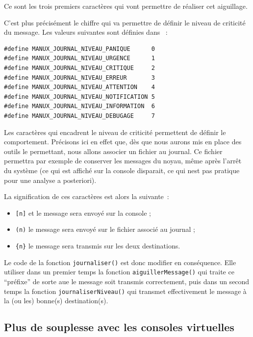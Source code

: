    Ce sont les trois premiers caractères qui vont permettre de
réaliser cet aiguillage.

   C'est plus précisément le chiffre qui va permettre de définir le
niveau de criticité du message. Les valeurs suivantes sont définies
dans ~:

\begin{lstlisting}
#define MANUX_JOURNAL_NIVEAU_PANIQUE      0
#define MANUX_JOURNAL_NIVEAU_URGENCE      1
#define MANUX_JOURNAL_NIVEAU_CRITIQUE     2
#define MANUX_JOURNAL_NIVEAU_ERREUR       3
#define MANUX_JOURNAL_NIVEAU_ATTENTION    4
#define MANUX_JOURNAL_NIVEAU_NOTIFICATION 5
#define MANUX_JOURNAL_NIVEAU_INFORMATION  6
#define MANUX_JOURNAL_NIVEAU_DEBUGAGE     7
\end{lstlisting}  

   Les caractères qui encadrent le niveau de criticité permettent de
définir le comportement. Précisons ici en effet que, dès que nous
aurons mis en place des outils le permettant, nous allons associer un
fichier au journal. Ce fichier permettra par exemple de conserver les
messages du noyau, même après l'arrêt du système (ce qui est affiché
sur la console disparait, ce qui nest pas pratique pour une analyse a
posteriori).

La signification de ces caractères est alors la suivante~:
\begin{itemize}
   \item \lstinline![n]! et le message sera envoyé sur la console ;
   \item \lstinline!(n)! le message sera envoyé sur le fichier
     associé au journal ;
   \item \lstinline!{n}! le message sera transmis sur les deux
      destinations.     
\end{itemize}

   Le code de la fonction \lstinline!journaliser()! est donc modifier
en conséquence. Elle utiliser dans un premier temps la fonction
\lstinline!aiguillerMessage()! qui traite ce ``préfixe'' de sorte aue
le message soit transmis correctement, puis dans un second temps la
fonction \lstinline!journaliserNiveau()! qui transmet effectivement le
message à la (ou les) bonne(s) destination(s).

%
\subsection{Plus de souplesse avec les consoles virtuelles}

